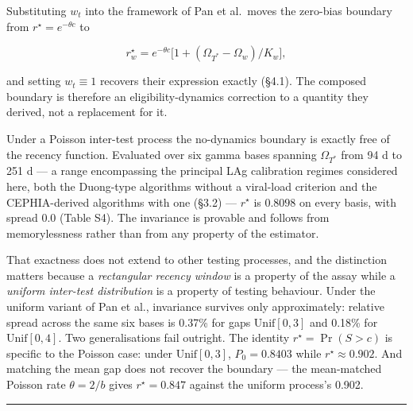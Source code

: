 Substituting \(w_t\) into the framework of Pan et al.~moves the zero-bias boundary from \(r^\star=e^{-\theta c}\) to

\[
r^\star_w = e^{-\theta c}\Big[1+(\Omega_{T^*}-\Omega_w)/K_w\Big] ,
\]

and setting \(w_t\equiv1\) recovers their expression exactly (§4.1). The composed boundary is therefore an eligibility-dynamics correction to a quantity they derived, not a replacement for it.

Under a Poisson inter-test process the no-dynamics boundary is exactly free of the recency function. Evaluated over six gamma bases spanning \(\Omega_{T^*}\) from 94 d to 251 d --- a range encompassing the principal LAg calibration regimes considered here, both the Duong-type algorithms without a viral-load criterion and the CEPHIA-derived algorithms with one (§3.2) --- \(r^\star\) is \(0.8098\) on every basis, with spread \(0.0\) (Table S4). The invariance is provable and follows from memorylessness rather than from any property of the estimator.

That exactness does not extend to other testing processes, and the distinction matters because a \emph{rectangular recency window} is a property of the assay while a \emph{uniform inter-test distribution} is a property of testing behaviour. Under the uniform variant of Pan et al., invariance survives only approximately: relative spread across the same six bases is 0.37\% for gaps \(\mathrm{Unif}[0,3]\) and 0.18\% for \(\mathrm{Unif}[0,4]\). Two generalisations fail outright. The identity \(r^\star=\Pr(S>c)\) is specific to the Poisson case: under \(\mathrm{Unif}[0,3]\), \(P_0=0.8403\) while \(r^\star\approx0.902\). And matching the mean gap does not recover the boundary --- the mean-matched Poisson rate \(\theta=2/b\) gives \(r^\star=0.847\) against the uniform process's 0.902.

\begin{center}\rule{0.5\linewidth}{0.5pt}\end{center}
